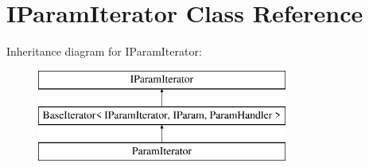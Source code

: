 \hypertarget{class_i_param_iterator}{}\section{I\+Param\+Iterator Class Reference}
\label{class_i_param_iterator}
Inheritance diagram for I\+Param\+Iterator\+:\begin{figure}[H]
\begin{center}
\leavevmode
\includegraphics[height=3.000000cm]{class_i_param_iterator}
\end{center}
\end{figure}
